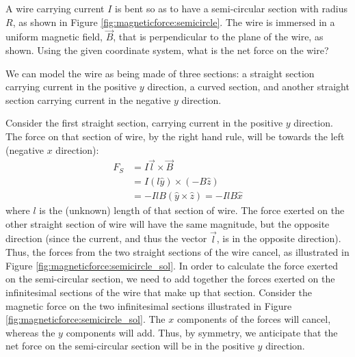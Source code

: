 \begin{example}{\label{ex:magneticforce:semicircle}A wire carrying current $I$ is bent so as to have a semi-circular section with radius $R$, as shown in Figure \ref{fig:magneticforce:semicircle}. The wire is immersed in a uniform magnetic field, $\vec B$, that is perpendicular to the plane of the wire, as shown. Using the given coordinate system, what is the net force on the wire? }

We can model the wire as being made of three sections: a straight section carrying current in the positive $y$ direction, a curved section, and another straight section carrying current in the negative $y$ direction.

Consider the first straight section, carrying current in the positive $y$ direction. The force on that section of wire, by the right hand rule, will be towards the left (negative $x$ direction):
\begin{align*}
F_S &= I \vec l \times \vec B\\
&= I (l\hat y) \times (-B\hat z)\\
&= -IlB (\hat y \times \hat z)=-IlB\hat x
\end{align*}
where $l$ is the (unknown) length of that section of wire. The force exerted on the other straight section of wire will have the same magnitude, but the opposite direction (since the current, and thus the vector $\vec l$, is in the opposite direction). Thus, the forces from the two straight sections of the wire cancel, as illustrated in Figure \ref{fig:magneticforce:semicircle_sol}.
In order to calculate the force exerted on the semi-circular section, we need to add together the forces exerted on the infinitesimal sections of the wire that make up that section. Consider the magnetic force on the two infinitesimal sections illustrated in Figure \ref{fig:magneticforce:semicircle_sol}. The $x$ components of the forces will cancel, whereas the $y$ components will add. Thus, by symmetry, we anticipate that the net force on the semi-circular section will be in the positive $y$ direction.


\end{example}
